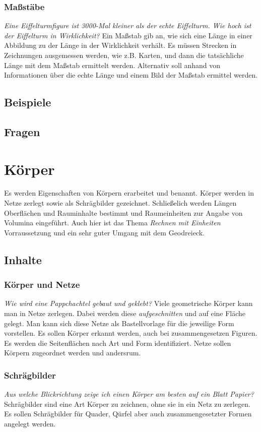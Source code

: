 \documentclass{article}
\begin{document}
\subsubsection*{Maßstäbe}
\textit{Eine Eiffelturmfigure ist 3000-Mal kleiner als der echte Eiffelturm. Wie hoch ist der Eiffelturm in Wirklichkeit?}
Ein Maßstab gib an, wie sich eine Länge in einer Abbildung zu der Länge in der Wirklichkeit verhält. Es müssen Strecken in Zeichnungen ausgemessen werden, wie z.B. Karten, und dann die tatsächliche Länge mit dem Maßstab ermittelt werden.
Alternativ soll anhand von Informationen über die echte Länge und einem Bild der Maßstab ermittel werden.
\subsection{Beispiele}
\subsection{Fragen}
\newpage
\section{Körper}
Es werden Eigenschaften von Körpern erarbeitet und benannt. Körper werden in Netze zerlegt sowie als Schrägbilder gezeichnet. Schließelich werden Längen Oberflächen und Rauminhalte bestimmt und Raumeinheiten zur Angabe von Volumina eingeführt.
Auch hier ist das Thema \textit{Rechnen mit Einheiten} Vorraussetzung und ein sehr guter Umgang mit dem Geodreieck.
\subsection{Inhalte}
\subsubsection*{ Körper und Netze}
\textit{Wie wird eine Pappchachtel gebaut und geklebt?}
Viele geometrische Körper kann man in Netze zerlegen. Dabei werden diese \textit{aufgeschnitten} und auf eine Fläche gelegt. Man kann sich diese Netze als Bastellvorlage für die jeweilige Form vorstellen.
Es sollen Körper erkannt werden, auch bei zusammengesetzen Figuren. Es werden die Seitenflächen nach Art und Form identifiziert. Netze sollen Körpern zugeordnet werden und andersrum. 
\subsubsection*{ Schrägbilder}
\textit{Aus welche Blickrichtung zeige ich einen Körper am besten auf ein Blatt Papier?}
Schrägbilder sind eine Art Körper zu zeichnen, ohne sie in ein Netz zu zerlegen. Es sollen Schrägbilder für Quader, Qürfel aber auch zusammengesetzter Formen angelegt werden.
\end{document}
